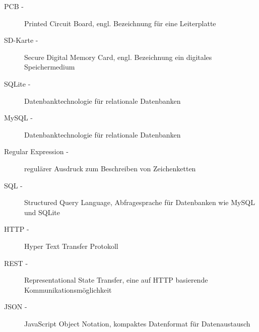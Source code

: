 \begin{description}
                \item[PCB -] Printed Circuit Board, engl. Bezeichnung für eine Leiterplatte
                \item[SD-Karte -] Secure Digital Memory Card, engl. Bezeichnung ein digitales Speichermedium
                \item[SQLite -] Datenbanktechnologie für relationale Datenbanken
                \item[MySQL -] Datenbanktechnologie für relationale Datenbanken
                \item[Regular Expression -] regulärer Ausdruck zum Beschreiben von Zeichenketten
                \item[SQL -] Structured Query Language, Abfragesprache für Datenbanken wie MySQL und SQLite
                \item[HTTP -] Hyper Text Transfer Protokoll
                \item[REST -] Representational State Transfer, eine auf HTTP basierende Kommunikationsmöglichkeit
                \item[JSON -] JavaScript Object Notation, kompaktes Datenformat für Datenaustausch
			\end{description}
